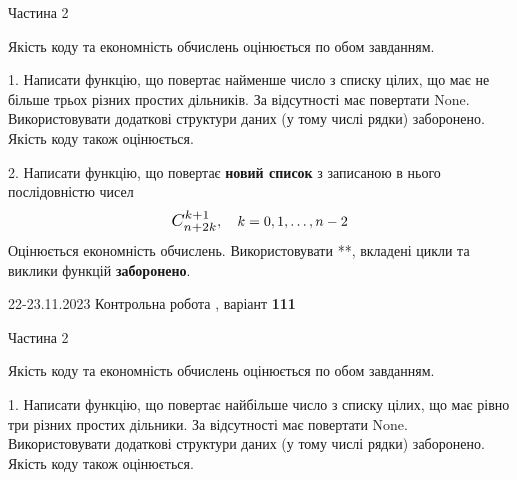 \documentclass[12pt, ukrainian]{article}
\begin{document}
{{{{{{{{{\begin {Huge}
\begin{center}Частина 2
\end{center}
\vspace{10mm}
\end {Huge}

{
\begin {Large}
Якість коду та економність обчислень оцінюється по обом завданням.

\vspace{5mm}

1. Написати функцію, що повертає найменше число з списку цілих, що має не більше трьох різних простих дільників. За відсутності має повертати None. Використовувати додаткові структури даних (у тому числі рядки) заборонено.\\	Якість коду також оцінюється. 



\vspace{10mm}



2. 
Написати функцію, що повертає \textbf{новий список} з записаною в нього послідовністю чисел
$$\scalebox{1.2}{$C_{n+2k}^{k+1}$}, \quad k=0,1,\ldots,n-2$$
Оцінюється економність обчислень. Використовувати **, вкладені цикли та виклики функцій \textbf{заборонено}.

\end{Large}\newpage




\begin {Huge}
{{22-23.11.2023 Контрольна робота , варіант  \No \textbf { 111 }\par}}

\begin{center}Частина 2
\end{center}
\vspace{10mm}
\end {Huge}

{
\begin {Large}
Якість коду та економність обчислень оцінюється по обом завданням.

\vspace{5mm}

1. Написати функцію, що повертає найбільше число з списку цілих, що має рівно три різних простих дільники. За відсутності має повертати None. Використовувати додаткові структури даних (у тому числі рядки) заборонено.\\	Якість коду також оцінюється. 




\end{Large}}}}}}}}}}}}
\end{document}
